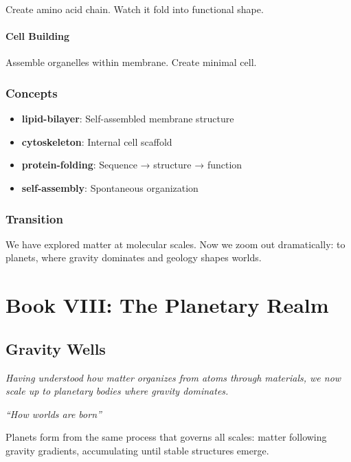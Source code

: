 \documentclass[
  11pt,
  letterpaper,
  twoside,
  openright]{book}
\providecommand{\tightlist}{%
  \setlength{\itemsep}{0pt}\setlength{\parskip}{0pt}}
\begin{document}
Create amino acid chain. Watch it fold into functional shape.

\subsection{Cell Building}\label{cell-building}

Assemble organelles within membrane. Create minimal cell.

\section{Concepts}\label{concepts-14}

\begin{itemize}
\tightlist
\item
  \textbf{lipid-bilayer}: Self-assembled membrane structure
\item
  \textbf{cytoskeleton}: Internal cell scaffold
\item
  \textbf{protein-folding}: Sequence → structure → function
\item
  \textbf{self-assembly}: Spontaneous organization
\end{itemize}

\section{Transition}\label{transition-14}

We have explored matter at molecular scales. Now we zoom out
dramatically: to planets, where gravity dominates and geology shapes
worlds.

\part{Book VIII: The Planetary Realm}

\chapter{Gravity Wells}\label{sec-gravity-wells}

\emph{Having understood how matter organizes from atoms through
materials, we now scale up to planetary bodies where gravity dominates.}

\emph{``How worlds are born''}

\begin{tcolorbox}[enhanced jigsaw, coltitle=black, colbacktitle=quarto-callout-note-color!10!white, toprule=.15mm, colframe=quarto-callout-note-color-frame, arc=.35mm, opacityback=0, bottomtitle=1mm, toptitle=1mm, breakable, colback=white, titlerule=0mm, opacitybacktitle=0.6, title=\textcolor{quarto-callout-note-color}{\faInfo}\hspace{0.5em}{Key Revelation}, rightrule=.15mm, bottomrule=.15mm, leftrule=.75mm, left=2mm]

Planets form from the same process that governs all scales: matter
following gravity gradients, accumulating until stable structures
emerge.

\end{tcolorbox}
\end{document}
